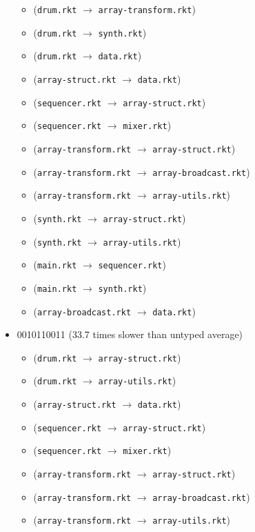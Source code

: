 \documentclass{article}
\newcommand{\mono}[1]{\texttt{#1}}
\begin{document}
\begin{itemize}
  \begin{itemize}
  \item (\mono{drum.rkt} $\rightarrow$ \mono{array-transform.rkt})
  \item (\mono{drum.rkt} $\rightarrow$ \mono{synth.rkt})
  \item (\mono{drum.rkt} $\rightarrow$ \mono{data.rkt})
  \item (\mono{array-struct.rkt} $\rightarrow$ \mono{data.rkt})
  \item (\mono{sequencer.rkt} $\rightarrow$ \mono{array-struct.rkt})
  \item (\mono{sequencer.rkt} $\rightarrow$ \mono{mixer.rkt})
  \item (\mono{array-transform.rkt} $\rightarrow$ \mono{array-struct.rkt})
  \item (\mono{array-transform.rkt} $\rightarrow$ \mono{array-broadcast.rkt})
  \item (\mono{array-transform.rkt} $\rightarrow$ \mono{array-utils.rkt})
  \item (\mono{synth.rkt} $\rightarrow$ \mono{array-struct.rkt})
  \item (\mono{synth.rkt} $\rightarrow$ \mono{array-utils.rkt})
  \item (\mono{main.rkt} $\rightarrow$ \mono{sequencer.rkt})
  \item (\mono{main.rkt} $\rightarrow$ \mono{synth.rkt})
  \item (\mono{array-broadcast.rkt} $\rightarrow$ \mono{data.rkt})
  \end{itemize}
\item 0010110011 (33.7 times slower than untyped average)
  \begin{itemize}
  \item (\mono{drum.rkt} $\rightarrow$ \mono{array-struct.rkt})
  \item (\mono{drum.rkt} $\rightarrow$ \mono{array-utils.rkt})
  \item (\mono{array-struct.rkt} $\rightarrow$ \mono{data.rkt})
  \item (\mono{sequencer.rkt} $\rightarrow$ \mono{array-struct.rkt})
  \item (\mono{sequencer.rkt} $\rightarrow$ \mono{mixer.rkt})
  \item (\mono{array-transform.rkt} $\rightarrow$ \mono{array-struct.rkt})
  \item (\mono{array-transform.rkt} $\rightarrow$ \mono{array-broadcast.rkt})
  \item (\mono{array-transform.rkt} $\rightarrow$ \mono{array-utils.rkt})

\end{itemize}
\end{itemize}
\end{document}
